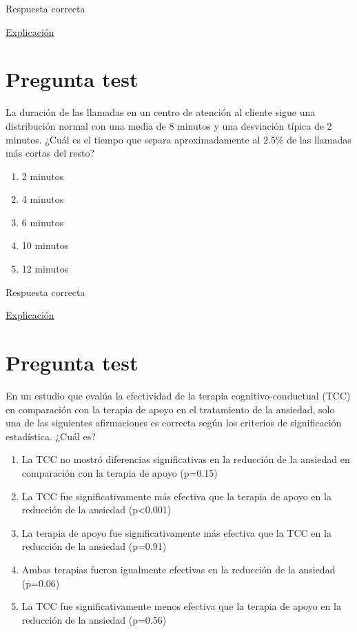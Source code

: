 \documentclass[
]{book}
\providecommand{\tightlist}{%
  \setlength{\itemsep}{0pt}\setlength{\parskip}{0pt}}
\begin{document}
Respuesta correcta

\href{https://1fjmanzano.github.io/bioestadistica/contrastes-de-hipo\%CC\%81tesis.html\#contrastes-bilaterales-y-unilaterales}{Explicación}

\hypertarget{pregunta-test-119}{%
\section{Pregunta test}\label{pregunta-test-119}}

La duración de las llamadas en un centro de atención al cliente sigue una distribución normal con una media de 8 minutos y una desviación típica de 2 minutos. ¿Cuál es el tiempo que separa aproximadamente al 2.5\% de las llamadas más cortas del resto?

\begin{enumerate}
\def\labelenumi{\alph{enumi})}
\tightlist
\item
  2 minutos
\item
  4 minutos
\item
  6 minutos
\item
  10 minutos
\item
  12 minutos
\end{enumerate}

Respuesta correcta

\href{https://homepage.divms.uiowa.edu/~mbognar/applets/normal.html}{Explicación}

\hypertarget{pregunta-test-120}{%
\section{Pregunta test}\label{pregunta-test-120}}

En un estudio que evalúa la efectividad de la terapia cognitivo-conductual (TCC) en comparación con la terapia de apoyo en el tratamiento de la ansiedad, solo una de las siguientes afirmaciones es correcta según los criterios de significación estadística. ¿Cuál es?

\begin{enumerate}
\def\labelenumi{\alph{enumi})}
\tightlist
\item
  La TCC no mostró diferencias significativas en la reducción de la ansiedad en comparación con la terapia de apoyo (p=0.15)
\item
  La TCC fue significativamente más efectiva que la terapia de apoyo en la reducción de la ansiedad (p\textless0.001)
\item
  La terapia de apoyo fue significativamente más efectiva que la TCC en la reducción de la ansiedad (p=0.91)
\item
  Ambas terapias fueron igualmente efectivas en la reducción de la ansiedad (p=0.06)
\item
  La TCC fue significativamente menos efectiva que la terapia de apoyo en la reducción de la ansiedad (p=0.56)
\end{enumerate}
\end{document}

